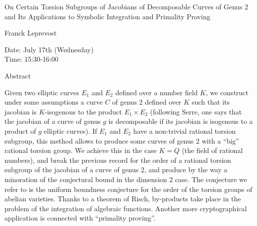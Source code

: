 \begin{center}
\LARGE
On Certain Torsion Subgroups of Jacobians of
   Decomposable Curves of Genus 2 and Its Applications to
         Symbolic Integration and Primality Proving 
\end{center}

\begin{center}
\Large
Franck Leprevost
\end{center}

\noindent
Date:  July 17th (Wednesday)\\
Time:  15:30-16:00\\

\begin{center}
\large
Abstract
\end{center}


Given two elliptic curves $E_1$ and $E_2$ defined over a number field $K$, we construct under
some assumptions a curve $C$ of genus 2 defined over $K$ such that its jacobian is
$K$-isogenous to the product $E_1 \times E_2$ (following Serre, one says that the jacobian of a
curve of genus $g$ is decomposable if its jacobian is isogenous to a product of $g$ elliptic curves).
If $E_1$ and $E_2$ have a non-trivial rational torsion subgroup, this method allows to produce
some curves of genus 2 with a ``big'' rational torsion group. We achieve this in the case $K=Q$
(the field of rational numbers), and break the previous record for the order of a rational torsion
subgroup of the jacobian of a curve of genus 2, and produce by the way a minoration of the
conjectural bound in the dimension 2 case. The conjecture we refer to is the uniform boundness
conjecture for the order of the torsion groups of abelian varieties. Thanks to a theorem of Risch,
by-products take place in the problem of the integration of algebraic functions. Another more
cryptographical application is connected with ``primality proving''. 

